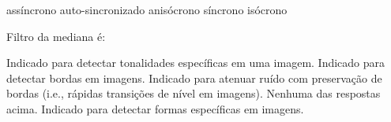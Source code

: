 \documentclass[12pt, addpoints]{exam}
\begin{document}
\begin{questions}
\begin{figure}
    \label{fig:enter-label}

\end{figure}
\begin{choices}
\choice assíncrono
\choice auto-sincronizado
\choice anisócrono
\choice síncrono
\choice isócrono
\end{choices}

\question

Filtro da mediana é:
\begin{choices}
\choice Indicado para detectar tonalidades específicas em uma imagem.
\choice Indicado para detectar bordas em imagens.
\choice Indicado para atenuar ruído com preservação de bordas (i.e., rápidas transições de nível em imagens).
\choice Nenhuma das respostas acima.
\choice Indicado para detectar formas específicas em imagens.
\end{choices}



    \end{questions}
    
\end{document}
